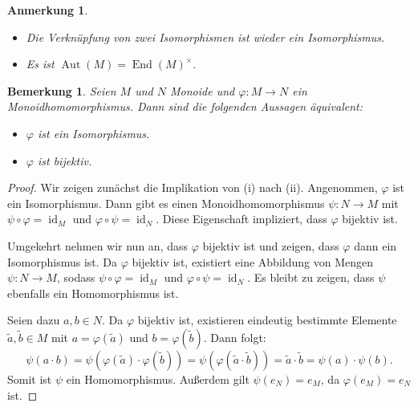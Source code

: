 \documentclass[a4paper, twoside, 11pt, ngerman]{report}
\DeclareMathOperator{\Aut}{Aut}
\DeclareMathOperator{\End}{End}
\DeclareMathOperator{\ident}{id}
\theoremstyle{definistyle}
\newtheorem{bem}[satz]{Bemerkung}
\newtheorem{anm}[satz]{Anmerkung}
\theoremstyle{remark}
\begin{document}
\begin{anm}\label{anm:verknuepfung_isomorph}
\begin{itemize}
\item Die Verknüpfung von zwei Isomorphismen ist wieder ein Isomorphismus.  
\item Es ist $\Aut(M) = \End(M)^{\times}.$
\end{itemize}
\end{anm}


\begin{bem}\label{bem:isomorph_bijektiv}
Seien $ M $ und $ N $ Monoide und $ \varphi: M \to N $ ein Monoidhomomorphismus. Dann sind die folgenden Aussagen äquivalent:
\begin{itemize}
    \item[(i)] $ \varphi $ ist ein Isomorphismus.
    \item[(ii)] $ \varphi $ ist bijektiv.
\end{itemize}
\end{bem}

\begin{proof}
Wir zeigen zunächst die Implikation von (i) nach (ii). Angenommen, $ \varphi $ ist ein Isomorphismus. Dann gibt es einen Monoidhomomorphismus $ \psi: N \to M $ mit $ \psi \circ \varphi = \ident_M $ und $ \varphi \circ \psi = \ident_N $. Diese Eigenschaft impliziert, dass $ \varphi $ bijektiv ist.

Umgekehrt nehmen wir nun an, dass $ \varphi $ bijektiv ist und zeigen, dass $ \varphi $ dann ein Isomorphismus ist. Da $ \varphi $ bijektiv ist, existiert eine Abbildung von Mengen $ \psi: N \to M $, sodass $ \psi \circ \varphi = \ident_M $ und $ \varphi \circ \psi = \ident_N $. Es bleibt zu zeigen, dass $ \psi $ ebenfalls ein Homomorphismus ist.

Seien dazu $ a, b \in N $. Da $ \varphi $ bijektiv ist, existieren eindeutig bestimmte Elemente $ \tilde{a}, \tilde{b} \in M $ mit $ a = \varphi(\tilde{a}) $ und $ b = \varphi(\tilde{b}) $. Dann folgt:
\[
\psi(a \cdot b) = \psi(\varphi(\tilde{a}) \cdot \varphi(\tilde{b})) = \psi(\varphi(\tilde{a} \cdot \tilde{b})) = \tilde{a} \cdot \tilde{b} = \psi(a) \cdot \psi(b).
\]
Somit ist $ \psi $ ein Homomorphismus. Außerdem gilt $ \psi(e_N) = e_M $, da $ \varphi(e_M) = e_N $ ist.
\end{proof}
\end{document}
